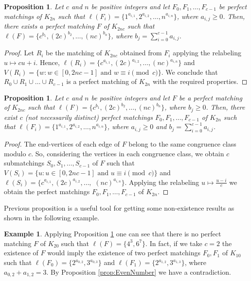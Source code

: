 \documentclass{amsart}
\newtheorem{prop}[defi]{Proposition}
\theoremstyle{definition}
\newtheorem{ex}[defi]{Example}
\numberwithin{equation}{section}
\begin{document}
\begin{prop}\label{prop:b}
Let $c$ and $n$ be positive integers and let $F_0,F_1,\ldots,F_{c-1}$ be perfect matchings of $K_{2n}$
such that $\ell(F_i)=\{1^{a_{i,1}},2^{a_{i,2}},\ldots, n^{a_{i,n}}\}$, where $a_{i,j}\geq 0$.
Then, there exists a perfect matching $F$ of $K_{2nc}$ such that $\ell(F)=\{c^{b_1},(2c)^{b_2},\ldots, (nc)^{b_n}\}$,
where $b_j=\sum\limits_{i=0}^{c-1}a_{i,j}$.
\end{prop}

\begin{proof}
Let $R_i$ be the matching of $K_{2nc}$ obtained from $F_i$ applying the relabeling $u \mapsto cu+i$.
Hence, $\ell(R_i)=\{c^{a_{i,1}},(2c)^{a_{i,2}},\ldots, (nc)^{a_{i,n}}\}$ and
$V(R_i)=\{w : w\in[0,2nc-1] \textrm{ and } w\equiv i\pmod{c} \}$.
We conclude that $R_0\cup R_1\cup \ldots \cup R_{c-1}$
is a perfect matching of $K_{2n}$ with the required properties.
\end{proof}

\begin{prop}\label{prop:c}
Let $c$ and $n$ be positive integers and let $F$ be a perfect matching of $K_{2nc}$ such that
$\ell(F)=\{c^{b_1},(2c)^{b_2},\ldots, (nc)^{b_n}\}$, where $b_j\geq 0$.
Then, there exist $c$ (not necessarily distinct) perfect matchings $F_0,F_1,\ldots,F_{c-1}$  of $K_{2n}$
such that $\ell(F_i)=\{1^{a_{i,1}},2^{a_{i,2}},\ldots, n^{a_{i,n}}\}$, where $a_{i,j}\geq 0$ and
$b_j=\sum\limits_{i=0}^{c-1}a_{i,j}$.
\end{prop}

\begin{proof}
The end-vertices of each edge of $F$ belong to the same congruence class modulo $c$.
So, considering the vertices in each congruence class, we obtain $c$ submatchings
$S_0,S_1,\ldots,S_{c-1}$ of $F$ such that $V(S_i)=\{u : u\in[0,2nc-1] \textrm{ and } u\equiv i\pmod{c} \}$
and $\ell(S_i)=\{c^{a_{i,1}},(2c)^{a_{i,2}},\ldots,$ $(nc)^{a_{i,n}}\}$.
Applying the relabeling $u\mapsto \frac{u-i}{c}$ we obtain the perfect matchings $F_0,F_1,\ldots,F_{c-1}$  of $K_{2n}$.
\end{proof}

Previous proposition is a  useful tool for getting some non-existence results as shown in the following example.

\begin{ex}
Applying Proposition \ref{prop:c} one can see that there is no perfect matching $F$ of $K_{20}$
such that $\ell(F)=\{4^3,6^7\}$. In fact, if we take $c=2$ the existence of $F$ would imply the
existence of two perfect matchings $F_0,F_1$ of $K_{10}$ such that $\ell(F_0)=\{2^{a_{0,2}},3^{a_{0,3}}\}$
and $\ell(F_1)=\{2^{a_{1,2}},3^{a_{1,3}}\}$, where $a_{0,2}+a_{1,2}=3$.
By Proposition \ref{prop:EvenNumber} we have a contradiction.
\end{ex}
\end{document}
